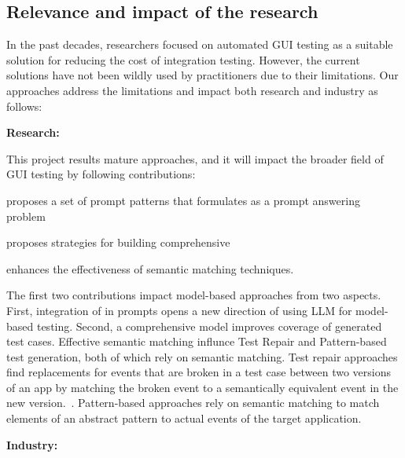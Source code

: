 \subsection{Relevance and impact of the research }


In the past decades, researchers focused on automated GUI testing as a suitable solution for reducing the cost of integration testing. However, the current solutions have not been wildly used by practitioners due to their limitations. 
Our approaches address the limitations and impact both research and industry as follows:




\smallskip
\noindent
\textbf{Research:}

\noindent
This project results mature \testreuse approaches, and it will impact the broader field of GUI testing by following contributions: 
\begin{inparaenum}[(i)]
\item proposes a set of prompt patterns that formulates \testreuse as a prompt answering problem 
\item proposes strategies for building comprehensive  \tam
\item enhances the effectiveness of semantic matching techniques.
\end{inparaenum}
The first two contributions impact model-based approaches from two aspects.
First, integration of \tam in prompts opens a new direction of using LLM for model-based testing.
Second, a comprehensive model improves coverage of generated test cases.
Effective semantic matching influnce Test Repair and Pattern-based test generation, both of which rely on semantic matching.
Test repair approaches find replacements for events that are broken in a test case between two versions of an app by matching the broken event to a semantically equivalent event in the new version.~\cite{Choudhary:Water:ETSE:2011,Stocco:VisualRepair:FSE:2018,Pan:Meter:TSE:2022}.
Pattern-based approaches rely on semantic matching to match elements of an abstract pattern to actual events of the target application.


\smallskip
\noindent
\textbf{Industry:}

